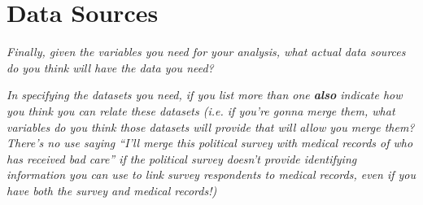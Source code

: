 \documentclass[12pt]{article}
\begin{document}
\section{Data Sources}

\emph{Finally, given the variables you need for your analysis, what actual data sources do you think will have the data you need?}

\emph{In specifying the datasets you need, if you list more than one \textbf{also} indicate how you think you can relate these datasets (i.e. if you're gonna merge them, what variables do you think those datasets will provide that will allow you merge them? There's no use saying ``I'll merge this political survey with medical records of who has received bad care'' if the political survey doesn't provide identifying information you can use to link survey respondents to medical records, even if you have both the survey and medical records!)}
\end{document}
